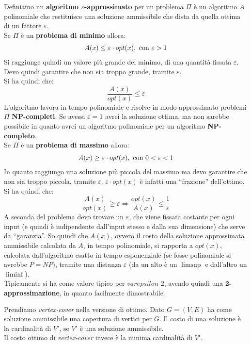 \documentclass[a4paper,12pt, oneside]{book}
\begin{document}
\begin{definizione}
  Definiamo un \textbf{algoritmo $\varepsilon$-approssimato} per un problema
  $\Pi$ è un 
  algoritmo $A$ polinomiale che restituisce una soluzione ammissibile che dista
  da quella ottima di un fattore $\varepsilon$.\\
  Se $\Pi$ è un \textbf{problema di minimo} allora:
  \[A(x)\leq \varepsilon\cdot opt(x), \mbox{ \textnormal{con} }\varepsilon>1\]
  Si raggiunge quindi un valore più grande del minimo, di una quantità fissata
  $\varepsilon$. Devo quindi garantire che non sia troppo grande, tramite
  $\varepsilon$.\\
  Si ha quindi che:
  \[\frac{A(x)}{opt(x)}\leq \varepsilon\]
  L'algoritmo lavora in tempo polinomiale e risolve in modo approssimato
  problemi $\Pi$ \textbf{NP-completi}. Se avessi $\varepsilon=1$ avrei la
  soluzione ottima, ma non sarebbe possibile in quanto avrei un algoritmo
  polinomiale per un algoritmo \textbf{NP-completo}.\\
  Se $\Pi$ è un \textbf{problema di massimo} allora:
  \[A(x)\geq \varepsilon\cdot opt(x), \mbox{ \textnormal{con} }0<\varepsilon<1\]
  In quanto raggiungo una soluzione più piccola del massimo ma devo garantire
  che non sia troppo piccola, tramite $\varepsilon$. $\varepsilon\cdot opt(x)$ è
  infatti una ``frazione'' dell'ottimo.\\
  Si ha quindi che:
  \[\frac{A(x)}{opt(x)}\geq \varepsilon\Longrightarrow\frac{opt(x)}{A(x)}\leq
    \frac{1}{\varepsilon}\]
  A seconda del problema devo trovare un $\varepsilon$, che viene fissata
  costante per ogni input (e quindi è indipendente dall'input stesso e dalla sua
  dimensione) che serve da ``garanzia''. So quindi che $A(x)$, ovvero il costo
  della soluzione approssimata ammissibile calcolata da $A$, in tempo
  polinomiale, si rapporta a $opt(x)$, calcolata dall'algoritmo esatto in tempo
  esponenziale (se fosse polinomiale si avrebbe $P=NP$), tramite una distanza
  $\varepsilon$ (da un alto è un $\limsup$ e dall'altro un $\liminf$).\\
  Tipicamente si ha come valore tipico per $varepsilon$ 2, avendo quindi
  una \textbf{2-approssimazione}, in quanto facilmente dimostrabile.
\end{definizione}
\begin{esempio}
  Prendiamo \textit{vertex-cover} nella versione di ottimo. Dato $G=(V,E)$ ha
  come soluzione ammissibile una copertura di vertici per $G$. Il costo di una
  soluzione è la cardinalità di $V'$, se $V'$ è una soluzione ammissibile.\\
  Il costo ottimo di \textit{vertex-cover} invece è la minima cardinalità di
  $V'$.
\end{esempio}
\end{document}
